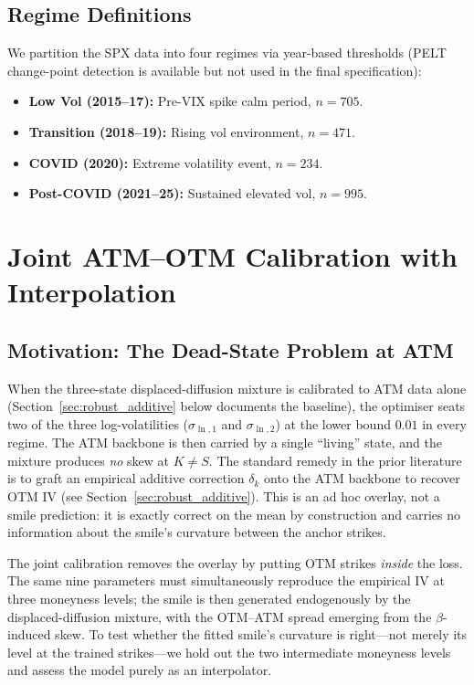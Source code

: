 \documentclass[12pt]{article}
\begin{document}
\subsection{Regime Definitions}

We partition the SPX data into four regimes via year-based thresholds (PELT change-point detection is available but not used in the final specification):
\begin{itemize}
  \item \textbf{Low Vol (2015--17):} Pre-VIX spike calm period, $n = 705$.
  \item \textbf{Transition (2018--19):} Rising vol environment, $n = 471$.
  \item \textbf{COVID (2020):} Extreme volatility event, $n = 234$.
  \item \textbf{Post-COVID (2021--25):} Sustained elevated vol, $n = 995$.
\end{itemize}

\section{Joint ATM--OTM Calibration with Interpolation}
\label{sec:joint}

\subsection{Motivation: The Dead-State Problem at ATM}
\label{sec:joint_motiv}

When the three-state displaced-diffusion mixture is calibrated to ATM data alone (Section~\ref{sec:robust_additive} below documents the baseline), the optimiser seats two of the three log-volatilities ($\sigma_{\ln,1}$ and $\sigma_{\ln,2}$) at the lower bound $0.01$ in every regime. The ATM backbone is then carried by a single ``living'' state, and the mixture produces \emph{no} skew at $K \ne S$. The standard remedy in the prior literature is to graft an empirical additive correction $\delta_k$ onto the ATM backbone to recover OTM IV (see Section~\ref{sec:robust_additive}). This is an ad hoc overlay, not a smile prediction: it is exactly correct on the mean by construction and carries no information about the smile's curvature between the anchor strikes.

The joint calibration removes the overlay by putting OTM strikes \emph{inside} the loss. The same nine parameters must simultaneously reproduce the empirical IV at three moneyness levels; the smile is then generated endogenously by the displaced-diffusion mixture, with the OTM--ATM spread emerging from the $\beta$-induced skew. To test whether the fitted smile's curvature is right---not merely its level at the trained strikes---we hold out the two intermediate moneyness levels and assess the model purely as an interpolator.
\end{document}
